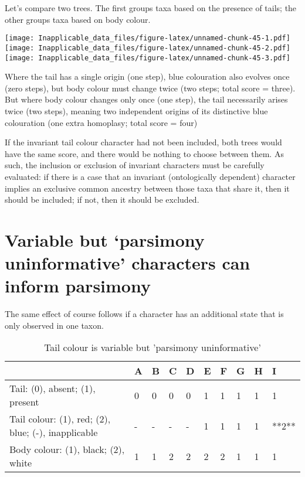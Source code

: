 \documentclass[]{book}
\theoremstyle{definition}
\theoremstyle{definition}
\theoremstyle{definition}
\theoremstyle{remark}
\begin{document}
Let's compare two trees. The first groups taxa based on the presence of
tails; the other groups taxa based on body colour.

\texttt{[image: Inapplicable\_data\_files/figure-latex/unnamed-chunk-45-1.pdf]}
\texttt{[image: Inapplicable\_data\_files/figure-latex/unnamed-chunk-45-2.pdf]}
\texttt{[image: Inapplicable\_data\_files/figure-latex/unnamed-chunk-45-3.pdf]}

Where the tail has a single origin (one step), blue colouration also
evolves once (zero steps), but body colour must change twice (two steps;
total score = three). But where body colour changes only once (one
step), the tail necessarily arises twice (two steps), meaning two
independent origins of its distinctive blue colouration (one extra
homoplasy; total score = four)

If the invariant tail colour character had not been included, both trees
would have the same score, and there would be nothing to choose between
them. As such, the inclusion or exclusion of invariant characters must
be carefully evaluated: if there is a case that an invariant
(ontologically dependent) character implies an exclusive common ancestry
between those taxa that share it, then it should be included; if not,
then it should be excluded.

\hypertarget{puip}{\section{\texorpdfstring{Variable but `parsimony
uninformative' characters can inform
parsimony}{Variable but parsimony uninformative characters can inform parsimony}}\label{puip}}

The same effect of course follows if a character has an additional state
that is only observed in one taxon.

\begin{table}

\caption{\label{tab:unnamed-chunk-46}Tail colour is variable but 'parsimony uninformative'}
\centering
\begin{tabular}[t]{l|l|l|l|l|l|l|l|l|l}
\hline
  & A & B & C & D & E & F & G & H & I\\
\hline
Tail: (0), absent; (1), present & 0 & 0 & 0 & 0 & 1 & 1 & 1 & 1 & 1\\
\hline
Tail colour: (1), red; (2), blue; (-), inapplicable & - & - & - & - & 1 & 1 & 1 & 1 & **2**\\
\hline
Body colour: (1), black; (2), white & 1 & 1 & 2 & 2 & 2 & 2 & 1 & 1 & 1\\
\hline
\end{tabular}
\end{table}
\end{document}
